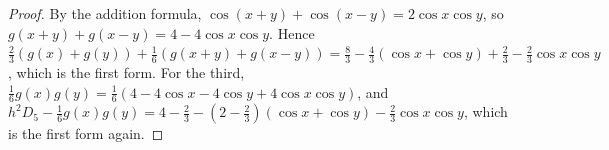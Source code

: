 \begin{proof}
\leanok
By the addition formula, $\cos(x+y) + \cos(x-y) = 2\cos x\cos y$, so
$g(x+y) + g(x-y) = 4 - 4\cos x\cos y$. Hence
$\tfrac23(g(x) + g(y)) + \tfrac16(g(x+y) + g(x-y)) = \tfrac83 - \tfrac43(\cos x + \cos y) + \tfrac23
- \tfrac23\cos x\cos y$, which is the first form. For the third,
$\tfrac16g(x)g(y) = \tfrac16(4 - 4\cos x - 4\cos y + 4\cos x\cos y)$, and
$h^2D_5 - \tfrac16g(x)g(y) = 4 - \tfrac23 - (2 - \tfrac23)(\cos x + \cos y) - \tfrac23\cos x\cos y$,
which is the first form again.
\end{proof}

